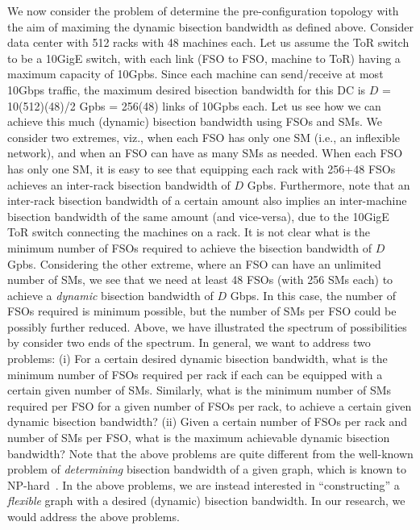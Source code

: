  We now consider
the problem of determine the pre-configuration topology with the 
aim of maximing the dynamic bisection bandwidth as defined above.
%
Consider data center with 512 racks with 48 machines each. Let us
assume the ToR switch to be a 10GigE switch, with each link (FSO to
FSO, machine to ToR) having a maximum capacity of 10Gpbs. Since each
machine can send/receive at most 10Gbps traffic, the maximum desired
bisection bandwidth for this DC is $D$ = 10(512)(48)/2 Gpbs = 256(48)
links of 10Gpbs each. Let us see how we can achieve this much
(dynamic) bisection bandwidth using FSOs and SMs.
%
We consider two extremes, viz., when each FSO has only one SM (i.e., 
an inflexible network), and when an FSO can have as many SMs as needed. 
%
When each FSO has only one SM, it is easy to see that equipping each
rack with 256+48 FSOs achieves an inter-rack bisection bandwidth of
$D$ Gpbs. Furthermore, note that an inter-rack bisection bandwidth of
a certain amount also implies an inter-machine bisection bandwidth of
the same amount (and vice-versa), due to the 10GigE ToR switch
connecting the machines on a rack. It is not clear what is the minimum
number of FSOs required to achieve the bisection bandwidth of $D$
Gpbs.
%
Considering the other extreme, where an FSO can have an unlimited
number of SMs, we see that we need at least 48 FSOs (with 256 SMs
each) to achieve a {\em dynamic} bisection bandwidth of $D$ Gbps.  In
this case, the number of FSOs required is minimum possible, but the
number of SMs per FSO could be possibly further reduced. 
%
Above, we have illustrated the spectrum of possibilities by consider
two ends of the spectrum. In general, we want to address two problems:
(i) For a certain desired dynamic bisection bandwidth, what is the
minimum number of FSOs required per rack if each can be equipped with
a certain given number of SMs. Similarly, what is the minimum number
of SMs required per FSO for a given number of FSOs per rack, to
achieve a certain given dynamic bisection bandwidth? (ii) Given a
certain number of FSOs per rack and number of SMs per FSO, what is the
maximum achievable dynamic bisection bandwidth?
%
Note that the above problems are quite different from the well-known
problem of {\em determining} bisection bandwidth of a given graph,
which is known to NP-hard~\cite{}. In the above problems, we are
instead interested in ``constructing'' a {\em flexible} graph with a
desired (dynamic) bisection bandwidth.  In our research, we would address the above
problems.

